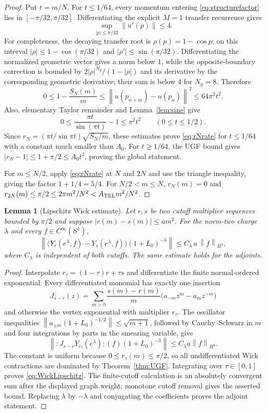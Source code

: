 \documentclass[11pt]{article}
\newtheorem{lemma}[theorem]{Lemma}
\theoremstyle{remark}
\newcommand{\norm}[1]{\left\lVert#1\right\rVert}
\begin{document}
\begin{proof}
Put $t=m/N$.  For $t\le1/64$, every momentum entering
\eqref{eq:structurefactor} lies in $[-\pi/32,\pi/32]$.  Differentiating
the explicit $M=1$ transfer recurrence gives
\[
 \sup_{|p|\le\pi/32}\norm{u'(p)}\le4.
\tag{5.8}\label{eq:edgederivative}
\]
For completeness, the decaying transfer root is
$\rho(p)=1-\cos p$; on this interval
$|\rho|\le1-\cos(\pi/32)$ and $|\rho'|\le\sin(\pi/32)$.
Differentiating the normalized geometric vector gives a norm below
$1$, while the opposite-boundary correction is bounded by
$2|\rho|^{N_y}/(1-|\rho|)$ and its derivative by the corresponding
geometric derivative; their sum is below $4$ for $N_y=8$.
Therefore
\[
 0\le1-\frac{S_N(m)}m
 \le\norm{u(p_{n+m})-u(p_n)}^2
 \le64\pi^2t^2.
\tag{5.9}\label{eq:Srate}
\]
Also, elementary Taylor remainder and
Lemma~\ref{lem:sine} give
\[
 0\le\frac{\pi t}{\sin(\pi t)}-1\le\pi^2t^2
 \qquad(0\le t\le1/2).
\tag{5.10}\label{eq:symbolrate}
\]
Since
$r_N=(\pi t/\sin\pi t)\sqrt{S_N/m}$, these estimates prove
\eqref{eq:rNrate} for $t\le1/64$ with a constant much smaller than
$A_0$.  For $t\ge1/64$, the UGF bound gives
$|r_N-1|\le1+\pi/2\le A_0t^2$, proving the global statement.

For $m\le N/2$, apply \eqref{eq:rNrate} at $N$ and $2N$ and use the
triangle inequality, giving the factor $1+1/4=5/4$.  For
$N/2<m\le N$, $r_N(m)=0$ and
$r_{2N}(m)\le\pi/2\le2\pi m^2/N^2<A_{\rm TEL}m^2/N^2$.
\end{proof}

\begin{lemma}[Lipschitz Wick estimate]\label{lem:WickLipschitz}
Let $r,s$ be two cutoff multiplier sequences bounded by $\pi/2$ and
suppose $|r(m)-s(m)|\le a m^2$.  For the norm-two charge
$\lambda$ and every $f\in C^\infty(S^1)$,
\[
 \norm{\bigl(Y_r(e^\lambda,f)-Y_s(e^\lambda,f)\bigr)
        (1+L_0)^{-3}}
 \le C_\lambda\,a\,\norm{f}_{H^4},
\tag{5.11}\label{eq:WickLipschitz}
\]
where $C_\lambda$ is independent of both cutoffs.  The same estimate
holds for the adjoints.
\end{lemma}

\begin{proof}
Interpolate $r_\tau=(1-\tau)r+\tau s$ and differentiate the finite
normal-ordered exponential.  Every differentiated monomial has exactly
one insertion
\[
 J_{s-r}(z)
 =\sum_{m>0}\frac{s(m)-r(m)}m
   \bigl(a_{-m}z^m-a_mz^{-m}\bigr)
\]
and otherwise the vertex exponential with multiplier $r_\tau$.
The oscillator inequalities
$\norm{a_{\pm m}(1+L_0)^{-1/2}}\le\sqrt{m+1}$, followed by
Cauchy--Schwarz in $m$ and four integrations by parts in the smearing
variable, give
\[
 \norm{:\!J_{s-r}Y_{r_\tau}(e^\lambda)\!:(f)
       (1+L_0)^{-3}}
 \le C_\lambda a\norm{f}_{H^4}.
\]
The constant is uniform because $0\le r_\tau(m)\le\pi/2$, so all
undifferentiated Wick contractions are dominated by
Theorem~\ref{thm:UGF}.  Integrating over $\tau\in[0,1]$ proves
\eqref{eq:WickLipschitz}.  The finite-cutoff calculation is an
absolutely convergent sum after the displayed graph weight; monotone
cutoff removal gives the asserted bound.  Replacing $\lambda$ by
$-\lambda$ and conjugating the coefficients proves the adjoint
statement.
\end{proof}
\end{document}
